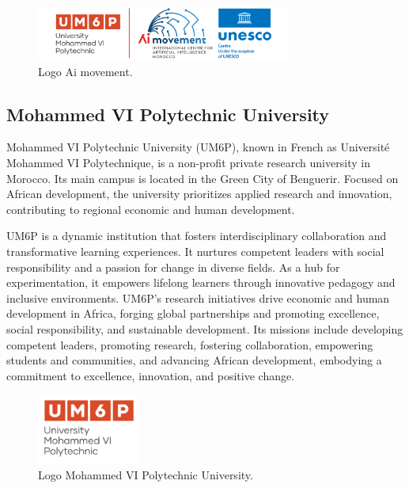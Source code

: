 \begin{figure}[H]
  \centering
  \includegraphics[width=0.75\textwidth]{images_pfe/AIM-UNESCO_EN.png}
  \caption{Logo Ai movement.}
\end{figure}
\FloatBarrier



\subsection{Mohammed VI Polytechnic University}

Mohammed VI Polytechnic University (UM6P), known in French as Université Mohammed VI Polytechnique, is a non-profit private research university in Morocco. Its main campus is located in the Green City of Benguerir. Focused on African development, the university prioritizes applied research and innovation, contributing to regional economic and human development. 

UM6P is a dynamic institution that fosters interdisciplinary collaboration and transformative learning experiences. It nurtures competent leaders with social responsibility and a passion for change in diverse fields. As a hub for experimentation, it empowers lifelong learners through innovative pedagogy and inclusive environments. UM6P's research initiatives drive economic and human development in Africa, forging global partnerships and promoting excellence, social responsibility, and sustainable development. Its missions include developing competent leaders, promoting research, fostering collaboration, empowering students and communities, and advancing African development, embodying a commitment to excellence, innovation, and positive change.

\begin{figure}[hbt!]
  \centering
  \includegraphics[width=0.3\textwidth]{images_pfe/um6p_logo.png}
  \caption{Logo Mohammed VI Polytechnic University.}
  \label{fig: Fusion PSA et FCA}
\end{figure}
\FloatBarrier



